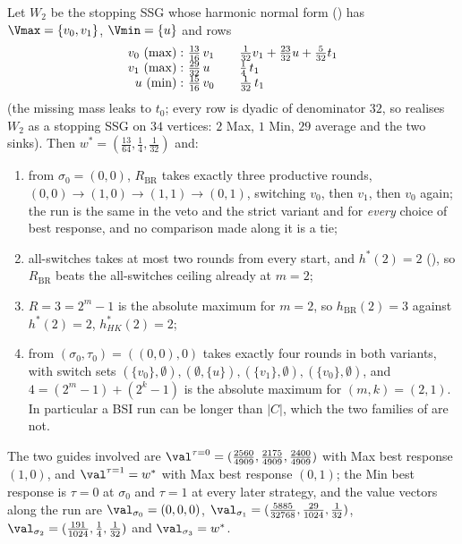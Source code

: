 \begin{proposition}\label{bsc:w2}
Let $W_2$ be the stopping SSG whose harmonic normal form
() has $\Vmax=\{v_0,v_1\}$, $\Vmin=\{u\}$ and rows
\[
\begin{array}{r@{\ }l@{\qquad}l}
 v_0\ (\max): & \tfrac{13}{16}\,v_1 & \tfrac1{32}v_1+\tfrac{23}{32}u+\tfrac5{32}t_1\\
 v_1\ (\max): & \tfrac{29}{32}\,u   & \tfrac14\,t_1\\
 u\ (\min):   & \tfrac{15}{16}\,v_0 & \tfrac1{32}\,t_1
\end{array}
\]
(the missing mass leaks to $t_0$; every row is dyadic of denominator $32$, so
 realises $W_2$ as a stopping SSG on $34$ vertices: $2$
Max, $1$ Min, $29$ average and the two sinks).  Then
$w^{\ast}=(\tfrac{13}{64},\tfrac14,\tfrac1{32})$ and:
\begin{enumerate}
\item[(i)] from $\sigma_0=(0,0)$, $R_{\mathrm{BR}}$ takes exactly three
 productive rounds, $(0,0)\to(1,0)\to(1,1)\to(0,1)$, switching $v_0$, then
 $v_1$, then $v_0$ again; the run is the same in the veto and the strict
 variant and for \emph{every} choice of best response, and no comparison made
 along it is a tie;
\item[(ii)] all-switches takes at most two rounds from every start, and
 $h^{\ast}(2)=2$ (), so $R_{\mathrm{BR}}$ beats the
 all-switches ceiling already at $m=2$;
\item[(iii)] $R=3=2^{m}-1$ is the absolute maximum for $m=2$, so
 $h_{\mathrm{BR}}(2)=3$ against $h^{\ast}(2)=2$, $h^{\ast}_{HK}(2)=2$;
\item[(iv)]  from $(\sigma_0,\tau_0)=((0,0),0)$ takes exactly
 four rounds in both variants, with switch sets
 $(\{v_0\},\emptyset),(\emptyset,\{u\}),(\{v_1\},\emptyset),(\{v_0\},\emptyset)$,
 and $4=(2^{m}-1)+(2^{k}-1)$ is the absolute maximum for $(m,k)=(2,1)$.  In
 particular a BSI run can be longer than $|C|$, which the two families of
  are not.
\end{enumerate}
The two guides involved are
$\val^{\tau=0}=(\tfrac{2560}{4909},\tfrac{2175}{4909},\tfrac{2400}{4909})$ with
Max best response $(1,0)$, and $\val^{\tau=1}=w^{\ast}$ with Max best response
$(0,1)$; the Min best response is $\tau=0$ at $\sigma_0$ and $\tau=1$ at every
later strategy, and the value vectors along the run are
$\val_{\sigma_0}=(0,0,0)$,
$\val_{\sigma_1}=(\tfrac{5885}{32768},\tfrac{29}{1024},\tfrac1{32})$,
$\val_{\sigma_2}=(\tfrac{191}{1024},\tfrac14,\tfrac1{32})$ and
$\val_{\sigma_3}=w^{\ast}$.
\end{proposition}

